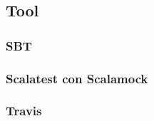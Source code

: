 \subsection{Tool}

\subsubsection{SBT}

\subsubsection{Scalatest con Scalamock} %

\subsubsection{Travis}